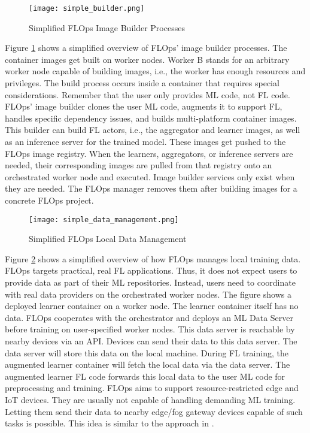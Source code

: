 \begin{figure}[h]
    \centering
    \texttt{[image: simple\_builder.png]}
    \caption{Simplified FLOps Image Builder Processes}
    \label{fig:flops_simple_image_builder}
\end{figure}

Figure \ref{fig:flops_simple_image_builder} shows a simplified overview of FLOps' image builder processes.
The container images get built on worker nodes.
Worker B stands for an arbitrary worker node capable of building images, i.e., the worker has enough resources and privileges.
The build process occurs inside a container that requires special considerations.
Remember that the user only provides ML code, not FL code.
FLOps' image builder clones the user ML code, augments it to support FL, handles specific dependency issues, and builds multi-platform container images.
This builder can build FL actors, i.e., the aggregator and learner images, as well as an inference server for the trained model.
These images get pushed to the FLOps image registry.
When the learners, aggregators, or inference servers are needed, their corresponding images are pulled from that registry onto an orchestrated worker node and executed.
Image builder services only exist when they are needed.
The FLOps manager removes them after building images for a concrete FLOps project.

\begin{figure}[H]
    \begin{adjustwidth}{-0.1\paperwidth}{-0.1\paperwidth}
        \centering
        \texttt{[image: simple\_data\_management.png]}
        \caption{Simplified FLOps Local Data Management}
        \label{fig:flops_simple_data_management}
    \end{adjustwidth}
\end{figure}

Figure \ref{fig:flops_simple_data_management} shows a simplified overview of how FLOps manages local training data.
FLOps targets practical, real FL applications.
Thus, it does not expect users to provide data as part of their ML repositories.
Instead, users need to coordinate with real data providers on the orchestrated worker nodes.
The figure shows a deployed learner container on a worker node.
The learner container itself has no data. 
FLOps cooperates with the orchestrator and deploys an ML Data Server before training on user-specified worker nodes.
This data server is reachable by nearby devices via an API.
Devices can send their data to this data server.
The data server will store this data on the local machine.
During FL training, the augmented learner container will fetch the local data via the data server.
The augmented learner FL code forwards this local data to the user ML code for preprocessing and training.
FLOps aims to support resource-restricted edge and IoT devices.
They are usually not capable of handling demanding ML training.
Letting them send their data to nearby edge/fog gateway devices capable of such tasks is possible.
This idea is similar to the approach in \cite{paper:global_fl_platform_for_iot}.


